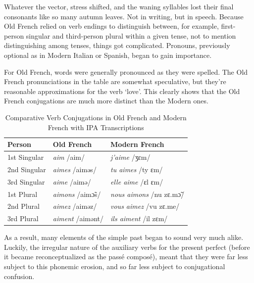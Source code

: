 Whatever the vector, stress shifted, and the waning syllables lost their final consonants like so many autumn leaves. Not in writing, but in speech. Because Old French relied on verb endings to distinguish between, for example, first-person singular and third-person plural within a given tense, not to mention distinguishing among tenses, things got complicated. Pronouns, previously optional as in Modern Italian or Spanish, began to gain importance.

For Old French, words were generally pronounced as they were spelled. The Old French pronunciations in the table are somewhat speculative, but they're reasonable approximations for the verb  `love'. This clearly shows that the Old French conjugations are much more distinct than the Modern ones.

\begin{table}[h]
\centering
\begin{tabular}{lll}
\hline
\textbf{Person}          & \textbf{Old French} & \textbf{Modern French} \\ \hline
1st Singular             & \textit{aim} /aim/   & \textit{j'aime} /ʒɛm/           \\
2nd Singular             & \textit{aimes} /aiməs/ & \textit{tu aimes} /ty ɛm/    \\
3rd Singular             & \textit{aime} /aimə/ & \textit{elle aime} /ɛl ɛm/ \\
1st Plural               & \textit{aimons} /aimɔ̃s/ & \textit{nous aimons} /nu zɛ.mɔ̃/ \\
2nd Plural               & \textit{aimez} /aiməz/ & \textit{vous aimez} /vu zɛ.me/ \\
3rd Plural               & \textit{aiment} /aimənt/ & \textit{ils aiment} /il zɛm/ \\ \hline
\end{tabular}
\caption{Comparative Verb Conjugations in Old French and Modern French with IPA Transcriptions}
\end{table}

As a result, many elements of the simple past began to sound very much alike. Luckily, the irregular nature of the auxiliary verbs for the present perfect (before it became reconceptualized as the passé composé), meant that they were far less subject to this phonemic erosion, and so far less subject to conjugational confusion.

